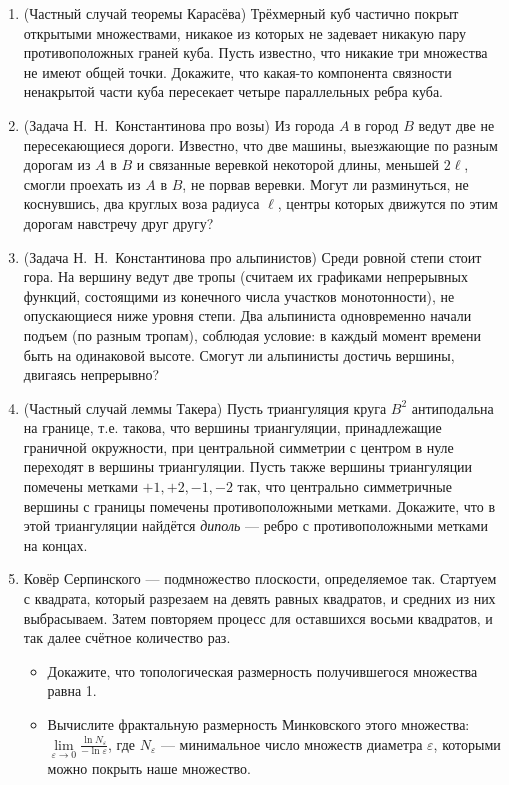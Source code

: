 \documentclass[12pt]{article}
\def\eps{\varepsilon}
\begin{document}
\begin{enumerate}
  \item (Частный случай теоремы Карасёва) Трёхмерный куб частично покрыт открытыми множествами, никакое из которых не задевает никакую пару противоположных граней куба. Пусть известно, что никакие три множества не имеют общей точки. Докажите, что какая-то компонента связности ненакрытой части куба пересекает четыре параллельных ребра куба.

  \item (Задача Н.~Н.~Константинова про возы) Из города $A$ в город $B$ ведут две не пересекающиеся дороги. Известно, что две машины, выезжающие по разным дорогам из $A$ в $B$ и связанные веревкой некоторой длины, меньшей $2\ell$, смогли проехать из $A$ в $B$, не порвав веревки. Могут ли разминуться, не коснувшись, два круглых воза радиуса $\ell$, центры которых движутся по этим дорогам навстречу друг другу?

  \item (Задача Н.~Н.~Константинова про альпинистов) Среди ровной степи стоит гора. На вершину ведут две тропы (считаем их графиками непрерывных функций, состоящими из конечного числа участков монотонности), не опускающиеся ниже уровня степи. Два альпиниста одновременно начали подъем (по разным тропам), соблюдая условие: в каждый момент времени быть на одинаковой высоте. Смогут ли альпинисты достичь вершины, двигаясь непрерывно?

  \item (Частный случай леммы Такера) Пусть триангуляция круга $B^2$ антиподальна на границе, т.е. такова, что вершины триангуляции, принадлежащие граничной окружности, при центральной симметрии с центром в нуле переходят в вершины триангуляции. Пусть также вершины триангуляции помечены метками $+1,+2,-1,-2$ так, что центрально симметричные вершины с границы помечены противоположными метками. Докажите, что в этой триангуляции найдётся \emph{диполь} --- ребро с противоположными метками на концах.

  \item Ковёр Серпинского --- подмножество плоскости, определяемое так. Стартуем с квадрата, который разрезаем на девять равных квадратов, и средних из них выбрасываем. Затем повторяем процесс для оставшихся восьми квадратов, и так далее счётное количество раз.
        \begin{itemize}
          \item Докажите, что топологическая размерность получившегося множества равна 1.
          \item Вычислите фрактальную размерность Минковского этого множества: $\lim\limits_{\eps \to 0} \frac{\ln N_\eps}{- \ln \eps}$, где $N_\eps$ --- минимальное число множеств диаметра $\eps$, которыми можно покрыть наше множество.
        \end{itemize}


\end{enumerate}
\end{document}
